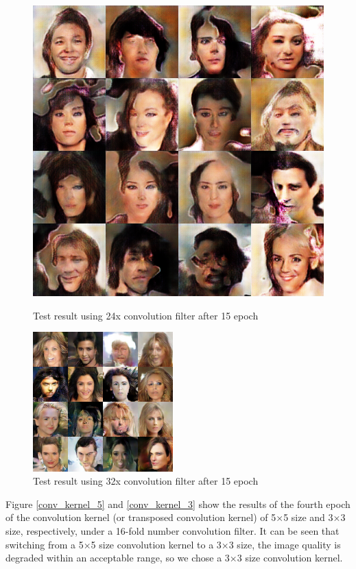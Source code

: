 \begin{figure}
\begin{minipage}[t]{0.48\linewidth}
        \includegraphics[width=\textwidth]{figures/result_conv_filter_24.png}
        \caption{Test result using 24x convolution filter after 15 epoch}
        \label{conv_filter_24}
    \end{minipage}
    \begin{minipage}[t]{\linewidth}
        \centering
        \includegraphics[width=0.48\textwidth]{figures/result_conv_filter_32.png}
        \caption{Test result using 32x convolution filter after 15 epoch}
        \label{conv_filter_32}
    \end{minipage}
\end{figure}

Figure \ref{conv_kernel_5} and \ref{conv_kernel_3} show the results of the fourth epoch of the convolution kernel (or transposed convolution kernel) of 5×5 size and 3×3 size,
    respectively, under a 16-fold number convolution filter.
It can be seen that switching from a 5×5 size convolution kernel to a 3×3 size,
    the image quality is degraded within an acceptable range, so we chose a 3×3 size convolution kernel.

